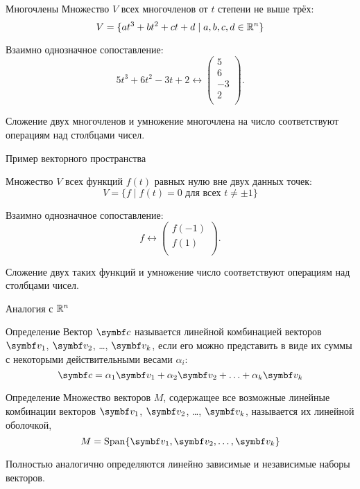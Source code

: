 \begin{frame}{Многочлены}
Множество $V$ всех многочленов от $t$ степени не выше трёх:
\[
V  = \{ at^3 + bt^2 + ct + d \mid a, b, c, d \in \mathbb{R}^n \}
\]

\pause
Взаимно однозначное сопоставление: 
\[5t^3 + 6t^2 - 3t + 2 \leftrightarrow \begin{pmatrix} 
    5 \\
    6 \\
    -3 \\
    2 \\
\end{pmatrix}.
\]
\pause


Сложение двух многочленов и умножение многочлена на число соответствуют операциям над столбцами чисел.
\end{frame}




\begin{frame}{Пример векторного пространства}

Множество $V$ всех функций $f(t)$ равных нулю вне двух данных точек:
\[
V  = \{ f \mid f(t)=0 \text{ для всех } t\neq \pm 1 \}
\]

\pause
Взаимно однозначное сопоставление: 
\[f \leftrightarrow \begin{pmatrix}
    f(-1) \\
    f(1) \\
\end{pmatrix}.
\]
\pause


Сложение двух таких функций и умножение  число соответствуют операциям над столбцами чисел.
\end{frame}
    

\begin{frame}{Аналогия с $\mathbb{R}^n$}

\begin{block}{Определение} 
Вектор $\bc$ называется \alert{линейной комбинацией} векторов $\bv_1$, $\bv_2$, \ldots, $\bv_k$, 
если его можно представить в виде их суммы с некоторыми действительными весами $\alpha_i$:
\[
  \bc = \alpha_1 \bv_1 + \alpha_2 \bv_2 + \ldots + \alpha_k \bv_k
\]
\end{block}

\pause
\begin{block}{Определение} 
Множество векторов $M$, содержащее все возможные линейные комбинации векторов $\bv_1$, 
$\bv_2$, \ldots, $\bv_k$, называется их \alert{линейной оболочкой},
\[
  M = \Span\{ \bv_1, \bv_2, \ldots, \bv_k \}
\]
\end{block}
    
\pause 
Полностью аналогично определяются линейно зависимые и независимые наборы векторов. 

\end{frame}


